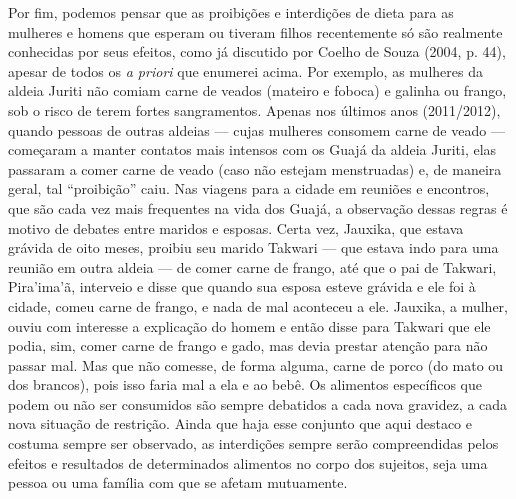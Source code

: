 Por fim, podemos pensar que as proibições e interdições de dieta para as
mulheres e homens que esperam ou tiveram filhos recentemente só são
realmente conhecidas por seus efeitos, como já discutido por Coelho de
Souza (2004, p. 44), apesar de todos os \emph{a priori} que enumerei
acima. Por exemplo, as mulheres da aldeia Juriti não comiam carne de
veados (mateiro e foboca) e galinha ou frango, sob o risco de terem
fortes sangramentos. Apenas nos últimos anos (2011/2012), quando pessoas
de outras aldeias --- cujas mulheres consomem carne de veado --- começaram a
manter contatos mais intensos com os Guajá da aldeia Juriti, elas
passaram a comer carne de veado (caso não estejam menstruadas) e, de
maneira geral, tal ``proibição'' caiu. Nas viagens para a cidade em
reuniões e encontros, que são cada vez mais frequentes na vida dos
Guajá, a observação dessas regras é motivo de debates entre maridos e
esposas. Certa vez, Jauxika, que estava grávida de oito meses, proibiu
seu marido Takwari --- que estava indo para uma reunião em outra aldeia ---
de comer carne de frango, até que o pai de Takwari, Pira'ima'ã,
interveio e disse que quando sua esposa esteve grávida e ele foi à
cidade, comeu carne de frango, e nada de mal aconteceu a ele. Jauxika, a
mulher, ouviu com interesse a explicação do homem e então disse para
Takwari que ele podia, sim, comer carne de frango e gado, mas devia
prestar atenção para não passar mal. Mas que não comesse, de forma
alguma, carne de porco (do mato ou dos brancos), pois isso faria mal a
ela e ao bebê. Os alimentos específicos que podem ou não ser consumidos
são sempre debatidos a cada nova gravidez, a cada nova situação de
restrição. Ainda que haja esse conjunto que aqui destaco e costuma
sempre ser observado, as interdições sempre serão compreendidas pelos
efeitos e resultados de determinados alimentos no corpo dos sujeitos,
seja uma pessoa ou uma família com que se afetam mutuamente.

